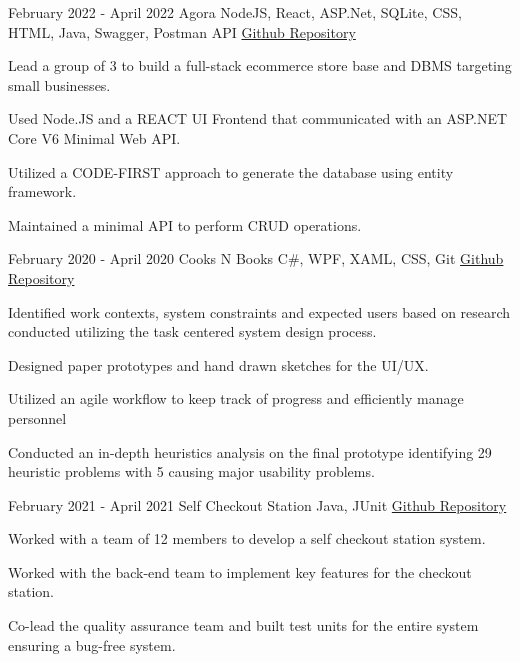 \documentclass[]{awesome-cv}
\begin{document}
\vspace{-11mm}
\vspace{-4mm}
\begin{cventries}
	  \cventry
	{February 2022 - April 2022}
    {Agora}
	{NodeJS, React, ASP.Net, SQLite, CSS, HTML, Java, Swagger, Postman API}
	{\href{https://github.com/krang-8/Agora}{Github Repository}}
    {
      \begin{cvitems} %
        \item {Lead a group of 3 to build a full-stack ecommerce store base and DBMS targeting small businesses.}
        \item {Used Node.JS and a REACT UI Frontend that communicated with an ASP.NET Core V6 Minimal Web API.}
        \item {Utilized a CODE-FIRST approach to generate the database using entity framework.}
        \item {Maintained a minimal API to perform CRUD operations.}
      \end{cvitems}
    }
    	\vspace{1mm}
    \vspace{-2mm}

		  \cventry
	{February 2020 - April 2020}
	{Cooks N Books}
	{C\#, WPF, XAML, CSS, Git }
	{\href{https://github.com/krang-8/cooksNbooks}{Github Repository}}
    {
      \begin{cvitems} %
        \item {Identified work contexts, system constraints and expected users based on research conducted utilizing the task centered system design process.}
        \item {Designed paper prototypes and hand drawn sketches for the UI/UX.}
        \item {Utilized an agile workflow to keep track of progress and efficiently manage personnel}
        \item { Conducted an in-depth heuristics analysis on the final prototype identifying 29 heuristic problems with 5 
causing major usability problems.}
      \end{cvitems}
    }
        	\vspace{1mm}
	  \cventry
	{February 2021 - April 2021}
    {Self Checkout Station}
	{Java, JUnit}
	{\href{https://github.com/krang-8/SENG-300-Iteration-3}{Github Repository}}
    {
      \begin{cvitems} %
        \item {Worked with a team of 12 members to develop a self checkout station system.}
        \item {Worked with the back-end team to implement key features for the checkout station.}
        \item {Co-lead the quality assurance team and built test units for the entire system ensuring a bug-free system.}
      \end{cvitems}
    }
    	\vspace{1mm}


\end{cventries}
\end{document}
